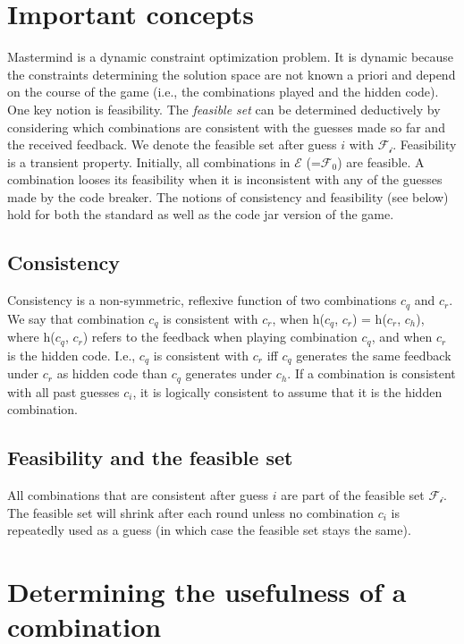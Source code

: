 \documentclass[12pt]{article}
\begin{document}
\section{Important concepts}

Mastermind is a dynamic constraint optimization problem. It is dynamic because the constraints determining the solution space are not known a priori and depend on the course of the game (i.e., the combinations played and the hidden code). One key notion is feasibility. The \textit{feasible set} can be determined deductively by considering which combinations are consistent with the guesses made so far and the received feedback. We denote the feasible set after guess $i$ with $\mathcal{F_i}$. Feasibility is a transient property. Initially, all combinations in $\mathcal{E}$ (={}$\mathcal{F_0}$) are feasible. A combination looses its feasibility when it is inconsistent with any of the guesses made by the code breaker. The notions of consistency and feasibility (see below) hold for both the standard as well as the code jar version of the game.

\subsection{Consistency}

Consistency is a non-symmetric, reflexive function of two combinations $c_q$ and $c_r$. We say that combination $c_q$ is consistent with $c_r$, when h($c_q$, $c_r$) = h($c_r$, $c_h$), where h($c_q$, $c_r$) refers to the feedback when playing combination $c_q$, and when $c_r$ is the hidden code. I.e., $c_q$ is consistent with $c_r$ iff $c_q$ generates the same feedback under  $c_r$ as hidden code than  $c_q$ generates under $c_h$. If a combination is consistent with all past guesses $c_i$, it is logically consistent to assume that it is the hidden combination. 

\subsection{Feasibility and the feasible set}

All combinations that are consistent after guess $i$ are part of the feasible set $\mathcal{F_i}$. 
The feasible set will shrink after each round unless no combination $c_i$ is repeatedly used as a guess (in which case the feasible set stays the same).


\section{Determining the usefulness of a combination}
\end{document}
